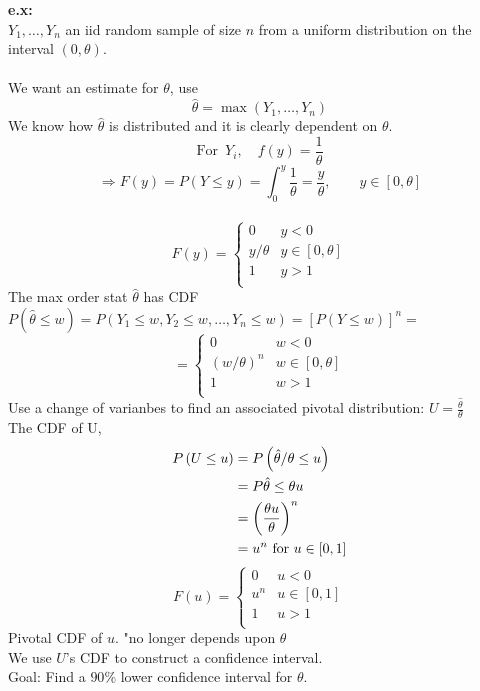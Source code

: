 \documentclass[12pt]{article}
\newcommand{\pars}[1]{\left( {#1} \right) }
\newcommand{\yn}{Y_1, \dots, Y_n}
\renewcommand{\over}[1]{\frac{1}{{#1}}}
\renewcommand{\P}[1]{P \left( {#1} \right) }
\begin{document}
\textbf{e.x:}\\

$\yn$ an iid random sample of size $n$ from a uniform distribution on the interval $(0, \theta)$.\\\\
We want an estimate for $\theta$, use
$$\hat{\theta} = \operatorname{max}(\yn)$$
We know how $\hat{\theta}$ is distributed and it is clearly dependent on $\theta$. 
$$\text{For } \, Y_i, \quad f(y) = \over{\theta}$$
$$\Rightarrow F(y) = P(Y \leq y) = \int_0^y \over{\theta} = \frac{y}{\theta}, \qquad y \in [0,\theta]$$
\\
$$F(y) = \begin{cases} 
      0 & y < 0 \\
      y/\theta & y \in [0, \theta]\\
      1 & y > 1\\
   \end{cases}$$
   The max order stat $\hat{\theta}$ has CDF $\P{\hat{\theta} \leq w} = \P{Y_1 \leq w, Y_2 \leq w, \dots, Y_n \leq w} = [\P{Y \leq w}]^n = $
   $$= \begin{cases} 
      0 & w < 0 \\
      (w/\theta)^n & w \in [0, \theta]\\
      1 & w > 1\\
   \end{cases}$$
   Use a change of varianbes to find an associated pivotal distribution: $U = \frac{\hat{\theta}}{\theta}$\\
   The CDF of U,
   \begin{align}
       \P{U\leq u} &= \P{\hat{\theta}/\theta \leq u} \notag\\
       &= P{\hat{\theta} \leq \theta u}\notag\\
       &= \pars{\frac{\theta u}{\theta}}^n \notag\\
       &= u^n \text{ for } u \in [0,1]\notag
   \end{align}
   $$F(u) = \begin{cases} 
      0 & u < 0 \\
      u^n & u \in [0, 1]\\
      1 & u > 1\\
   \end{cases}$$
   \color{red}Pivotal CDF of $u$.\color{black} "no longer depends upon $\theta$\\\color{green} We use $U$'s CDF to construct a confidence interval.\color{black}
   \\Goal: Find a $90\%$ lower confidence interval for $\theta$.
\end{document}
